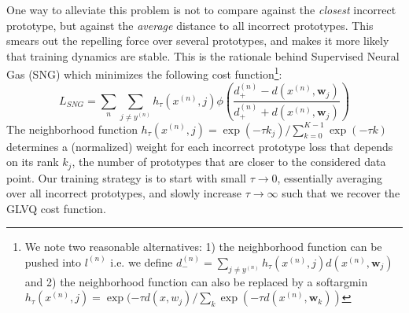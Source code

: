 \documentclass{esannV2}
\begin{document}
One way to alleviate this problem is not to compare against the \emph{closest} incorrect prototype, but against the \emph{average} distance to all incorrect prototypes. This smears out the repelling force over several prototypes, and makes it more likely that training dynamics are stable. This is the rationale behind Supervised Neural Gas (SNG) \cite{SNG} which minimizes the following cost function\footnote{We note two reasonable alternatives: 1) the neighborhood function can be pushed into $l^{(n)}$ i.e. we define $d^{(n)}_- = \sum_{j \neq y^{(n)}} h_\tau(x^{(n)}, j) d(x^{(n)}, \mathbf{w}_j)$ and 2) the neighborhood function can also be replaced by a softargmin $h_\tau(x^{(n)}, j) = \exp(-\tau d(x, w_j)/\sum_k \exp(-\tau d(x^{(n)}, \mathbf{w}_k))$}:
\begin{equation}
 L_{SNG} = \sum_n \sum_{j\neq y^{(n)}} h_\tau(x^{(n)}, j) \phi\left(\frac{d^{(n)}_+ - d(x^{(n)}, \mathbf{w}_j)}{d^{(n)}_+ + d(x^{(n)}, \mathbf{w}_j)}\right)
\end{equation}
The neighborhood function $h_\tau(x^{(n)}, j) = \exp(-\tau k_j)/ \sum_{k=0}^{K-1} \exp(-\tau k)$ determines a (normalized) weight for each incorrect prototype loss that depends on its rank $k_j$, the number of prototypes that are closer to the considered data point. Our training strategy is to start with small $\tau \rightarrow 0$, essentially averaging over all incorrect prototypes, and slowly increase $\tau \rightarrow \infty$ such that we recover the GLVQ cost function. 

\end{document}
